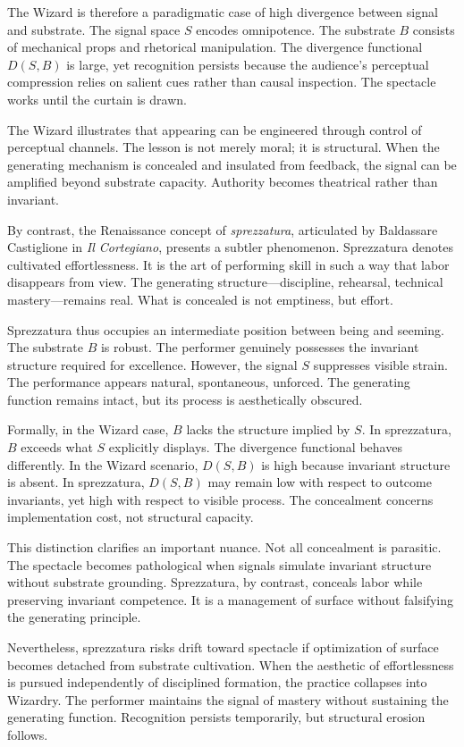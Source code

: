 \documentclass[11pt]{article}
\begin{document}
The Wizard is therefore a paradigmatic case of high divergence between signal and substrate. The signal space $S$ encodes omnipotence. The substrate $B$ consists of mechanical props and rhetorical manipulation. The divergence functional $D(S,B)$ is large, yet recognition persists because the audience’s perceptual compression relies on salient cues rather than causal inspection. The spectacle works until the curtain is drawn.

The Wizard illustrates that appearing can be engineered through control of perceptual channels. The lesson is not merely moral; it is structural. When the generating mechanism is concealed and insulated from feedback, the signal can be amplified beyond substrate capacity. Authority becomes theatrical rather than invariant.

By contrast, the Renaissance concept of \textit{sprezzatura}, articulated by Baldassare Castiglione in \textit{Il Cortegiano}, presents a subtler phenomenon. Sprezzatura denotes cultivated effortlessness. It is the art of performing skill in such a way that labor disappears from view. The generating structure—discipline, rehearsal, technical mastery—remains real. What is concealed is not emptiness, but effort.

Sprezzatura thus occupies an intermediate position between being and seeming. The substrate $B$ is robust. The performer genuinely possesses the invariant structure required for excellence. However, the signal $S$ suppresses visible strain. The performance appears natural, spontaneous, unforced. The generating function remains intact, but its process is aesthetically obscured.

Formally, in the Wizard case, $B$ lacks the structure implied by $S$. In sprezzatura, $B$ exceeds what $S$ explicitly displays. The divergence functional behaves differently. In the Wizard scenario, $D(S,B)$ is high because invariant structure is absent. In sprezzatura, $D(S,B)$ may remain low with respect to outcome invariants, yet high with respect to visible process. The concealment concerns implementation cost, not structural capacity.

This distinction clarifies an important nuance. Not all concealment is parasitic. The spectacle becomes pathological when signals simulate invariant structure without substrate grounding. Sprezzatura, by contrast, conceals labor while preserving invariant competence. It is a management of surface without falsifying the generating principle.

Nevertheless, sprezzatura risks drift toward spectacle if optimization of surface becomes detached from substrate cultivation. When the aesthetic of effortlessness is pursued independently of disciplined formation, the practice collapses into Wizardry. The performer maintains the signal of mastery without sustaining the generating function. Recognition persists temporarily, but structural erosion follows.
\end{document}

